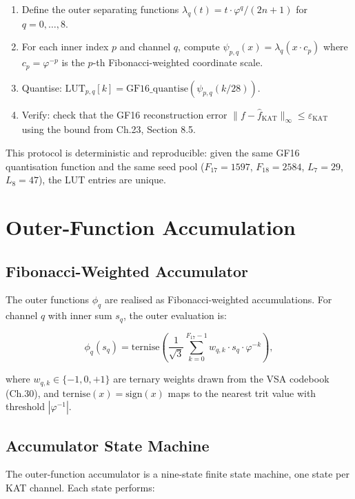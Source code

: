 \begin{enumerate}
\item Define the outer separating functions
$\lambda_q(t) = t \cdot \varphi^q / (2n+1)$ for $q = 0, \ldots, 8$.
\item For each inner index $p$ and channel $q$, compute
$\psi_{p,q}(x) = \lambda_q(x \cdot c_p)$ where $c_p = \varphi^{-p}$
is the $p$-th Fibonacci-weighted coordinate scale.
\item Quantise: $\mathrm{LUT}_{p,q}[k] = \mathrm{GF16\_quantise}(\psi_{p,q}(k/28))$.
\item Verify: check that the GF16 reconstruction error
$\|f - \hat{f}_{\mathrm{KAT}}\|_\infty \leq \varepsilon_{\mathrm{KAT}}$
using the bound from Ch.23, Section 8.5.
\end{enumerate}

This protocol is deterministic and reproducible: given the same GF16
quantisation function and the same seed pool ($F_{17} = 1597$, $F_{18}
= 2584$, $L_7 = 29$, $L_8 = 47$), the LUT entries are unique.

\section{Outer-Function Accumulation}
\label{app:G-outer-accum}

\subsection{Fibonacci-Weighted Accumulator}

The outer functions $\phi_q$ are realised as Fibonacci-weighted
accumulations. For channel $q$ with inner sum $s_q$, the outer
evaluation is:

\begin{equation}
\label{eq:G-outer-phi}
\phi_q(s_q) = \mathrm{ternise}\!\left(\frac{1}{\sqrt{3}} \sum_{k=0}^{F_{17}-1} w_{q,k} \cdot s_q \cdot \varphi^{-k}\right),
\end{equation}

where $w_{q,k} \in \{-1, 0, +1\}$ are ternary weights drawn from the
VSA codebook (Ch.30), and $\mathrm{ternise}(x) = \mathrm{sign}(x)$
maps to the nearest trit value with threshold $|\varphi^{-1}|$.

\subsection{Accumulator State Machine}

The outer-function accumulator is a nine-state finite state machine,
one state per KAT channel. Each state performs:

